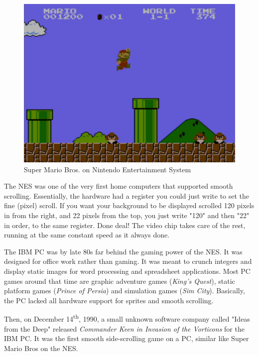 \documentclass[book.tex]{subfiles}
\begin{document}
\begin{figure}[H]
  \centering
 \includegraphics[width=1.0\textwidth]{screenshots_300dpi/Mario_Bros.png}
\caption{Super Mario Bros. on Nintendo Entertainment System}
\end{figure}

\par
The NES was one of the very first home computers that supported smooth scrolling. Essentially, the hardware had a register you could just write to set the fine (pixel) scroll. If you want your background to be displayed scrolled 120 pixels in from the right, and 22 pixels from the top, you just write "120" and then "22" in order, to the same register. Done deal! The video chip takes care of the rest, running at the same constant speed as it always done.\\
\par
The IBM PC was by late 80s far behind the gaming power of the NES. It was designed for office work rather than gaming. It was meant to crunch integers and display static images for word processing and spreadsheet applications. Most PC games around that time are graphic adventure games (\textit{King's Quest}), static platform games (\textit{Prince of Persia}) and simulation games (\textit{Sim City}). Basically, the PC lacked all hardware support for sprites and smooth scrolling.\\
\par
Then, on December 14\textsuperscript{th}, 1990, a small unknown software company called "Ideas from the Deep" released \textit{Commander Keen in Invasion of the Vorticons} for the IBM PC. It was the first smooth side-scrolling game on a PC, similar like Super Mario Bros on the NES. 
\end{document}
